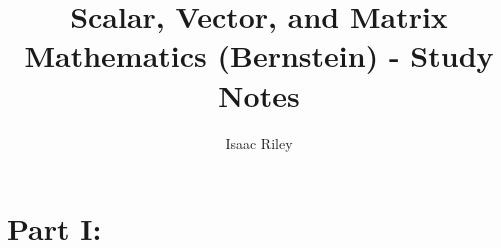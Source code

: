 \documentclass[a4paper]{article}
\title{Scalar, Vector, and Matrix Mathematics (Bernstein) - Study Notes}
\author{Isaac Riley}
\begin{document}
\maketitle
\tableofcontents
\newpage

\section*{Part I: }

\section{}

\subsection{}

\subsubsection{}


\section{}

\section{}

\section{}

\section{}

\section{}
\end{document}

